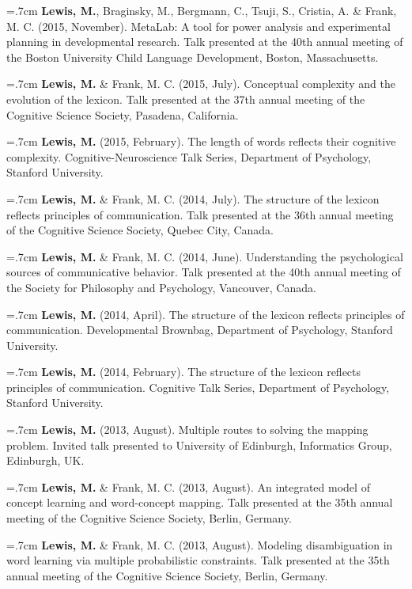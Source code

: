 \documentclass[letterpaper]{article}
\begin{document}
\hangindent=.7cm {\bf Lewis, M.},  Braginsky,  M.,  Bergmann, C., Tsuji, S., Cristia, A. \& Frank, M. C. (2015, November). MetaLab: A tool for power analysis and experimental planning in developmental research. Talk presented at the 40th annual meeting of the Boston University Child Language Development, Boston, Massachusetts.

\hangindent=.7cm {\bf Lewis, M.} \& Frank, M. C. (2015, July). Conceptual complexity and the evolution of the lexicon. Talk presented at the 37th annual meeting of the Cognitive Science Society, Pasadena, California.

\hangindent=.7cm {\bf Lewis, M.}  (2015, February). The length of words reflects their cognitive complexity. Cognitive-Neuroscience Talk Series, Department of Psychology, Stanford University.

\hangindent=.7cm {\bf Lewis, M.} \& Frank, M. C. (2014, July). The structure of the lexicon reflects  principles of communication. Talk presented at the 36th annual meeting of the Cognitive Science Society, Quebec City, Canada.

\hangindent=.7cm {\bf Lewis, M.} \& Frank, M. C. (2014, June). Understanding the psychological sources of communicative behavior. Talk presented at the 40th annual meeting of the Society for Philosophy and Psychology, Vancouver, Canada.

\hangindent=.7cm {\bf Lewis, M.} (2014, April). The structure of the lexicon reflects principles of communication. Developmental Brownbag, Department of Psychology, Stanford University.

\hangindent=.7cm {\bf Lewis, M.} (2014, February). The structure of the lexicon reflects principles of communication. Cognitive Talk Series, Department of Psychology, Stanford University.

 \hangindent=.7cm {\bf Lewis, M.} (2013, August). Multiple routes to solving the mapping problem. Invited talk presented to University of Edinburgh, Informatics Group,  Edinburgh, UK.

 \hangindent=.7cm {\bf Lewis, M.}  \& Frank, M. C. (2013, August). An integrated model of concept learning and word-concept mapping. Talk presented at the 35th annual meeting of the Cognitive Science Society, Berlin, Germany.
 
 \hangindent=.7cm {\bf Lewis, M.}  \& Frank, M. C.  (2013, August). Modeling disambiguation in word learning via multiple probabilistic constraints. Talk presented at the 35th annual meeting of the Cognitive Science Society, Berlin, Germany.
 
\end{document}
